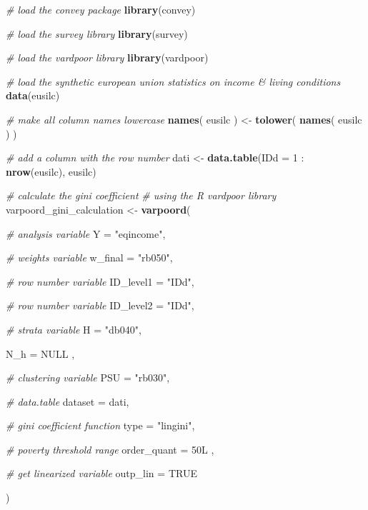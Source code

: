 \documentclass[]{book}
\newenvironment{Shaded}{\begin{snugshade}}{\end{snugshade}}
\newcommand{\KeywordTok}[1]{\textcolor[rgb]{0.13,0.29,0.53}{\textbf{{#1}}}}
\newcommand{\DataTypeTok}[1]{\textcolor[rgb]{0.13,0.29,0.53}{{#1}}}
\newcommand{\DecValTok}[1]{\textcolor[rgb]{0.00,0.00,0.81}{{#1}}}
\newcommand{\StringTok}[1]{\textcolor[rgb]{0.31,0.60,0.02}{{#1}}}
\newcommand{\CommentTok}[1]{\textcolor[rgb]{0.56,0.35,0.01}{\textit{{#1}}}}
\newcommand{\OtherTok}[1]{\textcolor[rgb]{0.56,0.35,0.01}{{#1}}}
\newcommand{\NormalTok}[1]{{#1}}
\begin{document}
\begin{Shaded}
\begin{Highlighting}[]
\CommentTok{# load the convey package}
\KeywordTok{library}\NormalTok{(convey)}

\CommentTok{# load the survey library}
\KeywordTok{library}\NormalTok{(survey)}

\CommentTok{# load the vardpoor library}
\KeywordTok{library}\NormalTok{(vardpoor)}

\CommentTok{# load the synthetic european union statistics on income & living conditions}
\KeywordTok{data}\NormalTok{(eusilc)}

\CommentTok{# make all column names lowercase}
\KeywordTok{names}\NormalTok{( eusilc ) <-}\StringTok{ }\KeywordTok{tolower}\NormalTok{( }\KeywordTok{names}\NormalTok{( eusilc ) )}

\CommentTok{# add a column with the row number}
\NormalTok{dati <-}\StringTok{ }\KeywordTok{data.table}\NormalTok{(}\DataTypeTok{IDd =} \DecValTok{1} \NormalTok{:}\StringTok{ }\KeywordTok{nrow}\NormalTok{(eusilc), eusilc)}

\CommentTok{# calculate the gini coefficient}
\CommentTok{# using the R vardpoor library}
\NormalTok{varpoord_gini_calculation <-}
\StringTok{    }\KeywordTok{varpoord}\NormalTok{(}
    
        \CommentTok{# analysis variable}
        \DataTypeTok{Y =} \StringTok{"eqincome"}\NormalTok{, }
        
        \CommentTok{# weights variable}
        \DataTypeTok{w_final =} \StringTok{"rb050"}\NormalTok{,}
        
        \CommentTok{# row number variable}
        \DataTypeTok{ID_level1 =} \StringTok{"IDd"}\NormalTok{,}
        
        \CommentTok{# row number variable}
        \DataTypeTok{ID_level2 =} \StringTok{"IDd"}\NormalTok{,}
        
        \CommentTok{# strata variable}
        \DataTypeTok{H =} \StringTok{"db040"}\NormalTok{, }
        
        \DataTypeTok{N_h =} \OtherTok{NULL} \NormalTok{,}
        
        \CommentTok{# clustering variable}
        \DataTypeTok{PSU =} \StringTok{"rb030"}\NormalTok{, }
        
        \CommentTok{# data.table}
        \DataTypeTok{dataset =} \NormalTok{dati, }
        
        \CommentTok{# gini coefficient function}
        \DataTypeTok{type =} \StringTok{"lingini"}\NormalTok{,}
      
      \CommentTok{# poverty threshold range}
      \DataTypeTok{order_quant =} \NormalTok{50L ,}
      
      \CommentTok{# get linearized variable}
      \DataTypeTok{outp_lin =} \OtherTok{TRUE}
        
    \NormalTok{)}
\end{Highlighting}
\end{Shaded}
\end{document}
